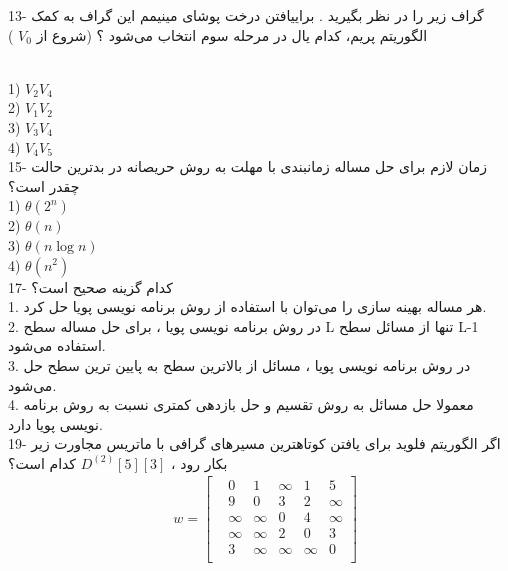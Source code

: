 \documentclass{book}
\begin{document}
13- گراف زیر را در نظر بگیرید . براییافتن درخت پوشای مینیمم این گراف به کمک الگوریتم پریم، کدام یال در مرحله سوم انتخاب می‌شود ؟ (شروع از $V_0 $ )\\

 \\

1) $V_2V_4$\\
2) $V_1V_2$    \\
3) $V_3V_4$  \\
4)   $V_4V_5$\\


15- زمان لازم برای حل مساله زمانبندی با مهلت به روش حریصانه در بدترین حالت چقدر است؟ \\
1) $\theta (2^n)$\\
2)   $\theta (n)$ \\
3)  $\theta (n\log n)$ \\
4)  $\theta (n^2)$ \\

17- کدام گزینه صحیح است؟ \\
1. هر مساله بهینه سازی را می‌توان با استفاده از روش برنامه نویسی پویا حل کرد.\\
2. در روش برنامه نویسی پویا ، برای حل مساله سطح L تنها از مسائل سطح L-1 استفاده می‌شود.\\
3. در روش برنامه نویسی پویا ، مسائل از بالاترین سطح به پایین ترین سطح حل می‌شود.\\
4. معمولا حل مسائل به روش تقسیم و حل بازدهی کمتری نسبت به روش برنامه نویسی پویا دارد.\\

19- اگر الگوریتم فلوید برای یافتن کوتاهترین مسیرهای گرافی با ماتریس مجاورت زیر بکار رود ، $D^{(2)}[5][3]$ کدام است؟\\
\begin{align*}
&w=
\begin{bmatrix}
& 0 & 1 &\infty & 1 & 5 \\
& 9 & 0 & 3  & 2 & \infty \\
& \infty & \infty & 0 & 4 & \infty \\
& \infty & \infty & 2 & 0 & 3 \\
& 3 & \infty &\infty & \infty & 0 \\
\end{bmatrix}
\end{align*}
\end{document}
